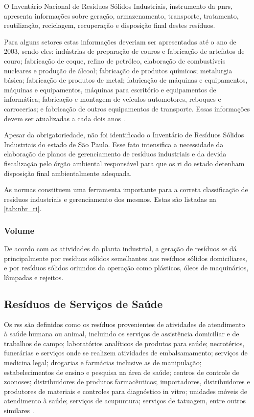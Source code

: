 O Inventário Nacional de Resíduos Sólidos Industriais, instrumento da \gls{pnrs}, apresenta informações sobre geração, armazenamento, transporte, tratamento, reutilização, reciclagem, recuperação e disposição final destes resíduos. 

Para alguns setores estas informações deveriam ser apresentadas até o ano de 2003, sendo eles: indústrias de preparação de couros e fabricação de artefatos de couro; fabricação de coque, refino de petróleo, elaboração de combustíveis nucleares e produção de álcool; fabricação de produtos químicos; metalurgia básica; fabricação de produtos de metal; fabricação de máquinas e equipamentos, máquinas e equipamentos, máquinas para escritório e equipamentos de informática; fabricação e montagem de veículos automotores, reboques e carrocerias; e fabricação de outros equipamentos de transporte. Essas informações devem ser atualizadas a cada dois anos \cite{conama:313}.

Apesar da obrigatoriedade, não foi identificado o Inventário de Resíduos Sólidos Industriais do estado de São Paulo. Esse fato intensifica a necessidade da elaboração de planos de gerenciamento de resíduos industriais e da devida fiscalização pelo órgão ambiental responsável para que os \gls{ri} do estado detenham disposição final ambientalmente adequada.

As normas constituem uma ferramenta importante para a correta classificação de resíduos industriais e gerenciamento dos mesmos. Estas são listadas na \autoref{tab:nbr_ri}.



\subsubsection{Volume}
De acordo com as atividades da planta industrial, a geração de resíduos se dá principalmente por resíduos sólidos semelhantes aos resíduos sólidos domiciliares, e por resíduos sólidos oriundos da operação como plásticos, óleos de maquinários, lâmpadas e rejeitos.


\subsection{Resíduos de Serviços de Saúde}
Os \gls{rss} são definidos como os resíduos provenientes de atividades de atendimento à saúde humana ou animal, incluindo os serviços de assistência domiciliar e de trabalhos de campo; laboratórios analíticos de produtos para saúde; necrotérios, funerárias e serviços onde se realizem atividades de embalsamamento; serviços de medicina legal; drogarias e farmácias inclusive as de manipulação; estabelecimentos de ensino e pesquisa na área de saúde; centros de controle de zoonoses; distribuidores de produtos farmacêuticos; importadores, distribuidores e produtores de materiais e controles para diagnóstico in vitro; unidades móveis de atendimento à saúde; serviços de acupuntura; serviços de tatuagem, entre outros similares \cite{conama:362}.

